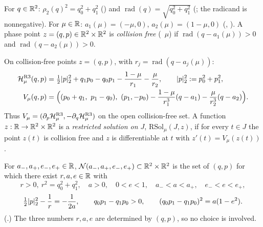 \begin{definition}\label{bpI:p0:primaries}
For $q\in\mathbb{R}^2$: $\rho_2(q)^2=q_0^2+q_1^2$ () and $\operatorname{rad}(q)=\sqrt{q_0^2+q_1^2}$
(; the radicand is nonnegative). For $\mu\in\mathbb{R}$: $a_1(\mu)=(-\mu,0)$, $a_2(\mu)=(1-\mu,0)$
(, ). A phase point $z=(q,p)\in\mathbb{R}^2\times\mathbb{R}^2$ is \emph{collision free}
(\ $\mu$) if $\operatorname{rad}(q-a_1(\mu))>0$ and $\operatorname{rad}(q-a_2(\mu))>0$.
\end{definition}

\begin{definition}\label{bpI:p0:restricted}
On collision-free points $z=(q,p)$, with $r_j=\operatorname{rad}(q-a_j(\mu))$:
\begin{align*}
\Ham^{\mathrm{R3}}_\mu(q,p)&=\tfrac12\abs p_2^2+q_1p_0-q_0p_1-\frac{1-\mu}{r_1}-\frac\mu{r_2},\qquad
\abs p_2^2:=p_0^2+p_1^2,\\
V_\mu(q,p)&=\Bigl((p_0+q_1,\ p_1-q_0),\ (p_1,-p_0)-\frac{1-\mu}{r_1^3}(q-a_1)-\frac{\mu}{r_2^3}(q-a_2)\Bigr).
\end{align*}
Thus $V_\mu=(\partial_p\mathcal H^{\mathrm{R3}}_\mu,-\partial_q\mathcal H^{\mathrm{R3}}_\mu)$ on the open collision-free set. A function
$z:\mathbb{R}\to\mathbb{R}^2\times\mathbb{R}^2$ is a \emph{restricted solution on $J$}, $\mathrm{RSol}_\mu(J,z)$, if for every $t\in J$ the
point $z(t)$ is collision free and $z$ is differentiable at $t$ with $z'(t)=V_\mu(z(t))$.
\end{definition}

\begin{definition}\label{bpI:p0:nearcircular}
For $a_-,a_+,e_-,e_+\in\mathbb{R}$, $\mathcal N(a_-,a_+,e_-,e_+)\subset\mathbb{R}^2\times\mathbb{R}^2$ is the set of $(q,p)$ for which
there exist $r,a,e\in\mathbb{R}$ with
\[
r>0,\ r^2=q_0^2+q_1^2,\quad a>0,\quad 0<e<1,\quad a_-<a<a_+,\quad e_-<e<e_+,
\]
\[
\tfrac12\lvert p\rvert_2^2-\frac1r=-\frac1{2a},\qquad q_0p_1-q_1p_0>0,\qquad (q_0p_1-q_1p_0)^2=a(1-e^2).
\]
(.) The three numbers $r,a,e$ are determined by $(q,p)$, so no choice is involved.
\end{definition}

